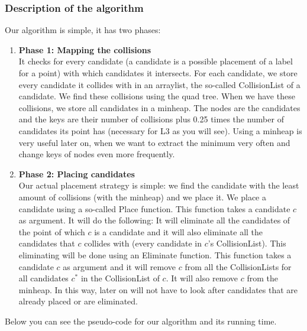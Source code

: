 \documentclass[crop=false,a4paper,oneside,11pt]{article}
\begin{document}
\subsubsection{Description of the algorithm}
Our algorithm is simple, it has two phases:
\begin{enumerate}
\item \textbf{Phase 1: Mapping the collisions}\\
It checks for every candidate (a candidate is a possible placement of a label for a point) with which candidates it intersects. For each candidate, we store every candidate it collides with in an arraylist, the so-called CollisionList of a candidate. We find these collisions using the quad tree. When we have these collisions, we store all candidates in a minheap. The nodes are the candidates and the keys are their number of collisions plus 0.25 times the number of candidates its point has (necessary for L3 as you will see). Using a minheap is very useful later on, when we want to extract the minimum very often and change keys of nodes even more frequently.
\item \textbf{Phase 2: Placing candidates}\\
Our actual placement strategy is simple: we find the candidate with the least amount of collisions (with the minheap) and we place it. We place a candidate using a so-called Place function. This function takes a candidate $c$ as argument. It will do the following: It will eliminate all the candidates of the point of which $c$ is a candidate and it will also eliminate all the candidates that $c$ collides with (every candidate in $c$'s CollisionList). This eliminating will be done using an Eliminate function. This function takes a candidate $c$ as argument and it will remove $c$ from all the CollisionLists for all candidates $c^*$ in the CollisionList of $c$. It will also remove $c$ from the minheap. In this way, later on will not have to look after candidates that are already placed or are eliminated. 
\end{enumerate}
Below you can see the pseudo-code for our algorithm and its running time.
\end{document}
